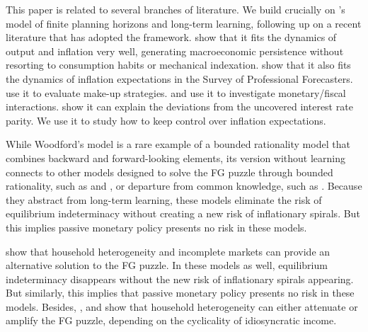 \documentclass{article}
\begin{document}
This paper is related to several branches of literature. We build crucially on \citet{Woodford2019}'s model of finite planning horizons and long-term learning, following up on a recent literature that has adopted the framework. \citet{GHLS2020} show that it fits the dynamics of output and inflation very well, generating macroeconomic persistence without resorting to consumption habits or mechanical indexation. \cite{Gustetal2024} show that it also fits the dynamics of inflation expectations in the Survey of Professional Forecasters. \cite{FPHIFLAP} use it to evaluate make-up strategies.
\citet{WoodfordXie2020} and \cite{Xie2020} use it to investigate monetary/fiscal interactions. \cite{NaXie2022} show it can explain the deviations from the uncovered interest rate parity. We use it to study how to keep control over inflation expectations.

While Woodford's model is a rare example of a bounded rationality model that combines backward and forward-looking elements, its version without learning connects to other models designed to solve the FG puzzle through bounded rationality, such as \citet{Gabaix2020} and \citet{FarhiWerning2019}, or departure from common knowledge, such as \citet{AngeletosLian2018}. Because they abstract from long-term learning, these models eliminate the risk of equilibrium indeterminacy without creating a new risk of inflationary spirals. But this implies passive monetary policy presents no risk in these models.

\cite{MKNS2016} show that household heterogeneity and incomplete markets can provide an alternative solution to the FG puzzle. In these models as well, equilibrium indeterminacy disappears without the new risk of inflationary spirals appearing. But similarly, this implies that passive monetary policy presents no risk in these models. Besides, \cite{Bilbiie2020}, \cite{Werning2015} and \cite{AcharyaDogra2020} show that household heterogeneity can either attenuate or amplify the FG puzzle, depending on the cyclicality of idiosyncratic income.
\end{document}
